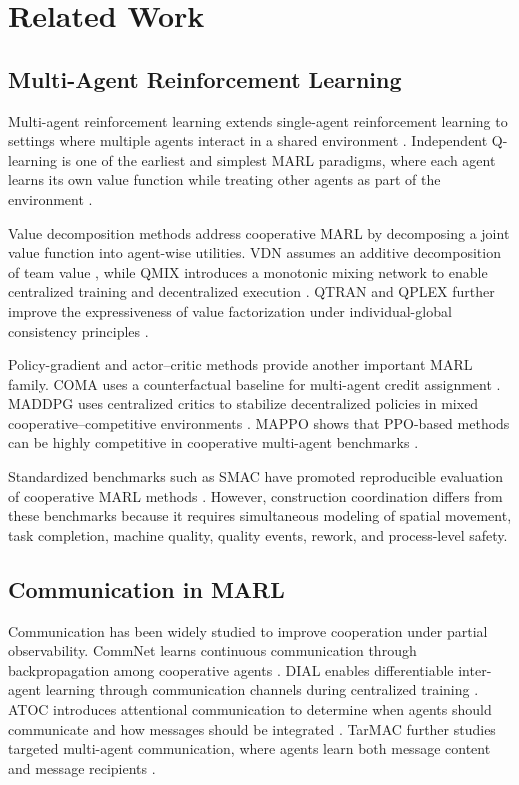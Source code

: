 \documentclass[fleqn,10pt]{wlpeerj}
\begin{document}
\section{Related Work}

\subsection{Multi-Agent Reinforcement Learning}

Multi-agent reinforcement learning extends single-agent reinforcement learning to settings where multiple agents interact in a shared environment \cite{SuttonBarto2018RL,Tan1993MARL}. Independent Q-learning is one of the earliest and simplest MARL paradigms, where each agent learns its own value function while treating other agents as part of the environment \cite{Tan1993MARL}.

Value decomposition methods address cooperative MARL by decomposing a joint value function into agent-wise utilities. VDN assumes an additive decomposition of team value \cite{Sunehag2018VDN}, while QMIX introduces a monotonic mixing network to enable centralized training and decentralized execution \cite{Rashid2018QMIX}. QTRAN and QPLEX further improve the expressiveness of value factorization under individual-global consistency principles \cite{Son2019QTRAN,Wang2021QPLEX}.

Policy-gradient and actor--critic methods provide another important MARL family. COMA uses a counterfactual baseline for multi-agent credit assignment \cite{Foerster2018COMA}. MADDPG uses centralized critics to stabilize decentralized policies in mixed cooperative--competitive environments \cite{Lowe2017MADDPG}. MAPPO shows that PPO-based methods can be highly competitive in cooperative multi-agent benchmarks \cite{Schulman2017PPO,Yu2022MAPPO}.

Standardized benchmarks such as SMAC have promoted reproducible evaluation of cooperative MARL methods \cite{Samvelyan2019SMAC}. However, construction coordination differs from these benchmarks because it requires simultaneous modeling of spatial movement, task completion, machine quality, quality events, rework, and process-level safety.

\subsection{Communication in MARL}

Communication has been widely studied to improve cooperation under partial observability. CommNet learns continuous communication through backpropagation among cooperative agents \cite{Sukhbaatar2016CommNet}. DIAL enables differentiable inter-agent learning through communication channels during centralized training \cite{Foerster2016DIAL}. ATOC introduces attentional communication to determine when agents should communicate and how messages should be integrated \cite{Jiang2018ATOC}. TarMAC further studies targeted multi-agent communication, where agents learn both message content and message recipients \cite{Das2019TarMAC}.
\end{document}
